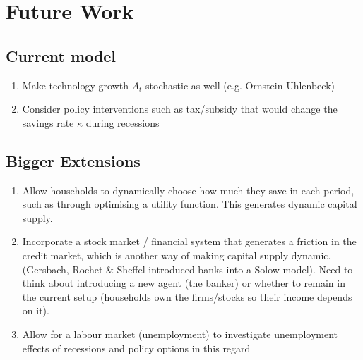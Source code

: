 \documentclass[11pt]{article}
\begin{document}
\section{Future Work}
\subsection{Current model}
\begin{enumerate}
\item Make technology growth $A_t$ stochastic as well (e.g. Ornstein-Uhlenbeck)
\item Consider policy interventions such as tax/subsidy that would change the savings rate $\kappa$ during recessions
\end{enumerate}

\subsection{Bigger Extensions}
\begin{enumerate}
\item Allow households to dynamically choose how much they save in each period, such as through optimising a utility function. This generates dynamic capital supply.\item Incorporate a stock market / financial system that generates a friction in the credit market, which is another way of making capital supply dynamic. (Gersbach, Rochet \& Sheffel introduced banks into a Solow model). Need to think about introducing a new agent (the banker) or whether to remain in the current setup (households own the firms/stocks so their income depends on it).
\item Allow for a labour market (unemployment) to investigate unemployment effects of recessions and policy options in this regard
\end{enumerate}
\end{document}
